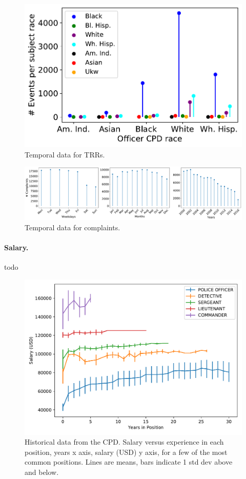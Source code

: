 \begin{figure}[h] 
	\includegraphics[width=\textwidth]{figs/trr_stats_race_race} 
	\caption{Temporal data for TRRs.} \label{fig:trrs_stats2}
\end{figure}


\begin{figure}[h] 
	\includegraphics[width=\textwidth]{figs/complaints_times} 
	\caption{Temporal data for complaints.} \label{fig:complaints}
\end{figure}


\paragraph{Salary.} todo

\begin{figure}[h] 
\includegraphics[width=\textwidth]{figs/salary} 
\caption{Historical data from the CPD. Salary versus experience in each
position, years x axis, salary (USD) y axis, for a few of the most common
positions. Lines are means, bars indicate 1 std dev above and below.} \label{fig:salary}
\end{figure}

